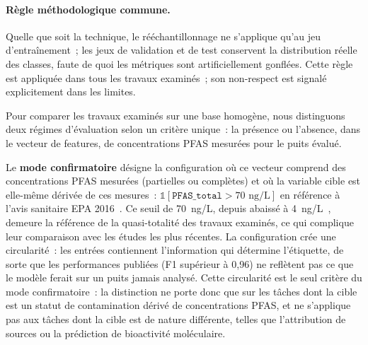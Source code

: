 \paragraph{R\`egle m\'ethodologique commune.}
Quelle que soit la technique, le r\'e\'echantillonnage ne s'applique qu'au jeu d'entra\^inement~; les jeux de validation et de test conservent la distribution r\'eelle des classes, faute de quoi les m\'etriques sont artificiellement gonfl\'ees.
Cette r\`egle est appliqu\'ee dans tous les travaux examin\'es~; son non-respect est signal\'e explicitement dans les limites.


\label{sec:chap2-modes}

Pour comparer les travaux examin\'es sur une base homog\`ene, nous distinguons deux r\'egimes d'\'evaluation selon un crit\`ere unique~: la pr\'esence ou l'absence, dans le vecteur de features, de concentrations PFAS mesur\'ees pour le puits \'evalu\'e.

Le \textbf{mode confirmatoire} d\'esigne la configuration o\`u ce vecteur comprend des concentrations PFAS mesur\'ees (partielles ou compl\`etes) et o\`u la variable cible est elle-m\^eme d\'eriv\'ee de ces mesures~: $\mathbb{1}[\texttt{PFAS\_total} > 70\text{ ng/L}]$ en r\'ef\'erence \`a l'avis sanitaire EPA 2016~\cite{epa2016pfas}.
Ce seuil de 70~ng/L, depuis abaiss\'e \`a 4~ng/L~\cite{epa2023npdwr}, demeure la r\'ef\'erence de la quasi-totalit\'e des travaux examin\'es, ce qui complique leur comparaison avec les \'etudes les plus r\'ecentes.
La configuration cr\'ee une circularit\'e~: les entr\'ees contiennent l'information qui d\'etermine l'\'etiquette, de sorte que les performances publi\'ees (F1 sup\'erieur \`a 0,96) ne refl\`etent pas ce que le mod\`ele ferait sur un puits jamais analys\'e.
Cette circularit\'e est le seul crit\`ere du mode confirmatoire~: la distinction ne porte donc que sur les t\^aches dont la cible est un statut de contamination d\'eriv\'e de concentrations PFAS, et ne s'applique pas aux t\^aches dont la cible est de nature diff\'erente, telles que l'attribution de sources ou la pr\'ediction de bioactivit\'e mol\'eculaire.

